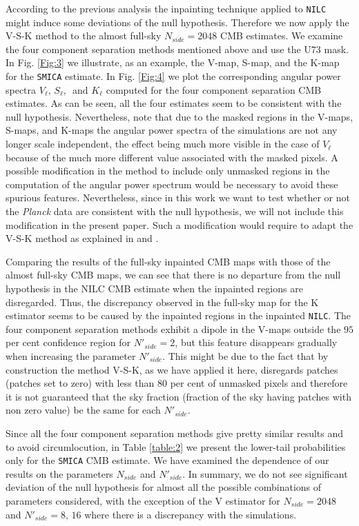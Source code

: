 According to the previous analysis the inpainting technique applied to \texttt{NILC} might induce some deviations of the null hypothesis. Therefore we now apply the V-S-K method to the almost full-sky $N_{side}=2048$ CMB estimates. We examine the four component separation methods mentioned above and use the U73 mask. In Fig. \ref{Fig:3} we illustrate, as an example, the V-map, S-map, and the K-map for the \texttt{SMICA} estimate. In Fig. \ref{Fig:4} we plot the corresponding angular power spectra $V_{\ell},\, S_{\ell},\, $ and $K_{\ell}$ computed for the four component separation CMB estimates. As can be seen, all the four estimates seem to be consistent with the null hypothesis. Nevertheless, note that due to the masked regions in the V-maps, S-maps, and K-maps the angular power spectra of the simulations are not any longer scale independent, the effect being much more visible in the case of $V_{\ell}$ because of the much more different value associated with the masked pixels. A possible modification in the method to include only unmasked regions in the computation of the angular power spectrum would be necessary to avoid these spurious features. Nevertheless, since in this work we want to test whether or not the \textit{Planck} data are consistent with the null hypothesis, we will not include  this modification in the present paper. Such a modification would require to adapt the V-S-K method as explained in \cite{Gorski:1994ye} and \cite{Hivon:2001jp}.

Comparing the results of the full-sky inpainted CMB maps with those of the almost full-sky CMB maps, we can see that there is no departure from the null hypothesis in the NILC CMB estimate when the inpainted regions are disregarded. Thus, the discrepancy observed in the full-sky map for the K estimator seems to be caused by the inpainted regions in the inpainted \texttt{NILC}. The four component separation methods exhibit a dipole in the V-maps outside the $95$ per cent confidence region for $N'_{side}=2$, but this feature disappears gradually  when increasing the parameter $N'_{side}$. This might be due to the fact that by construction the method V-S-K, as we have applied it here, disregards patches (patches set to zero) with less than $80$ per cent of unmasked pixels and therefore it is not guaranteed that the sky fraction (fraction of the sky having patches with non zero value) be the same for each $N'_{side}$. 

Since all the four component separation methods give pretty similar results and to avoid circumlocution, in Table \ref{table:2} we present the lower-tail probabilities only for the \texttt{SMICA} CMB estimate. We have examined the dependence of our results on the parameters $N_{side}$ and $N'_{side}$. In summary, we do not see significant deviation of the null hypothesis for almost all the possible combinations of parameters considered, with the exception of the V estimator for $N_{side}=2048$ and $N'_{side}=8,\,16$ where there is a discrepancy with the simulations.
 

